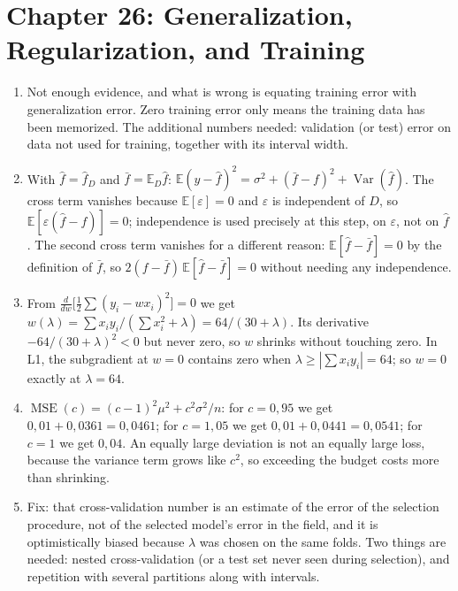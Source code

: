 \section*{Chapter 26: Generalization, Regularization, and Training}
\begin{enumerate}[label=\textbf{26.\arabic*}]
  \item Not enough evidence, and what is wrong is equating training error with
        generalization error. Zero training error only means the training data has been
        memorized. The additional numbers needed: validation (or test) error on data not
        used for training, together with its interval width.

  \item With $\hat f=\hat f_{D}$ and $\bar f=\mathbb{E}_{D}\hat f$:
        $\mathbb{E}(y-\hat f)^{2}=\sigma^{2}+(\bar f-f)^{2}+\operatorname{Var}(\hat f)$.
        The cross term vanishes because $\mathbb{E}[\varepsilon]=0$ and $\varepsilon$
        is independent of $D$, so $\mathbb{E}[\varepsilon(\hat f-f)]=0$; independence
        is used precisely at this step, on $\varepsilon$, not on $\hat f$. The second
        cross term vanishes for a different reason: $\mathbb{E}[\hat f-\bar f]=0$ by
        the definition of $\bar f$, so $2(f-\bar f)\,\mathbb{E}[\hat f-\bar f]=0$
        without needing any independence.

  \item From $\frac{d}{dw}\bigl[\frac12\sum(y_{i}-wx_{i})^{2}\bigr]=0$ we get
        $w(\lambda)=\sum x_{i}y_{i}/(\sum x_{i}^{2}+\lambda)=64/(30+\lambda)$.
        Its derivative $-64/(30+\lambda)^{2}<0$ but never zero, so $w$ shrinks
        without touching zero. In L1, the subgradient at $w=0$ contains zero when
        $\lambda\ge|\sum x_{i}y_{i}|=64$; so $w=0$ exactly at $\lambda=64$.

  \item $\operatorname{MSE}(c)=(c-1)^{2}\mu^{2}+c^{2}\sigma^{2}/n$: for
        $c=0{,}95$ we get $0{,}01+0{,}0361=0{,}0461$; for $c=1{,}05$ we get
        $0{,}01+0{,}0441=0{,}0541$; for $c=1$ we get $0{,}04$. An equally large deviation
        is not an equally large loss, because the variance term grows like $c^{2}$, so
        exceeding the budget costs more than shrinking.

  \item Fix: that cross-validation number is an estimate of the error of the selection
        procedure, not of the selected model's error in the field, and it is
        optimistically biased because $\lambda$ was chosen on the same folds. Two
        things are needed: nested cross-validation (or a test set never seen during
        selection), and repetition with several partitions along with intervals.


\end{enumerate}
